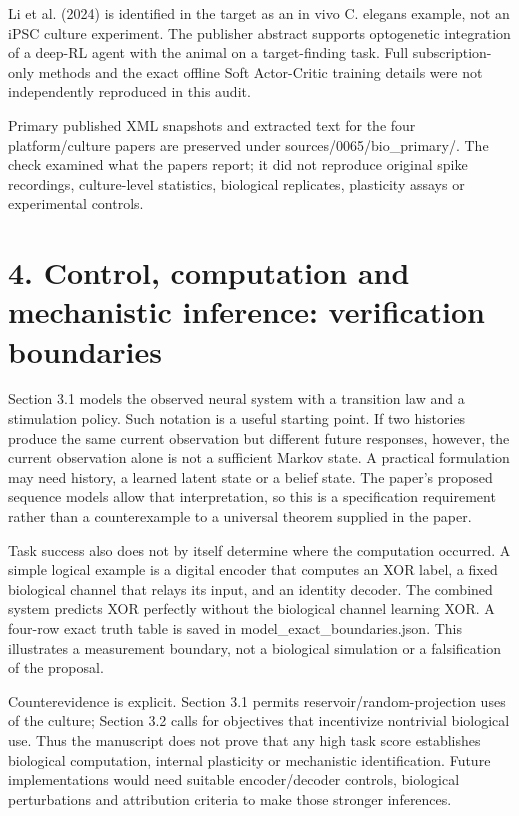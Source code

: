 \documentclass[10pt]{article}
\begin{document}
Li et al. (2024) is identified in the target as an in vivo C. elegans example, not an iPSC culture experiment. The publisher abstract supports optogenetic integration of a deep-RL agent with the animal on a target-finding task. Full subscription-only methods and the exact offline Soft Actor-Critic training details were not independently reproduced in this audit.\par
Primary published XML snapshots and extracted text for the four platform/culture papers are preserved under sources/0065/bio\_primary/. The check examined what the papers report; it did not reproduce original spike recordings, culture-level statistics, biological replicates, plasticity assays or experimental controls.\par
\section*{4. Control, computation and mechanistic inference: verification boundaries}
Section 3.1 models the observed neural system with a transition law and a stimulation policy. Such notation is a useful starting point. If two histories produce the same current observation but different future responses, however, the current observation alone is not a sufficient Markov state. A practical formulation may need history, a learned latent state or a belief state. The paper’s proposed sequence models allow that interpretation, so this is a specification requirement rather than a counterexample to a universal theorem supplied in the paper.\par
Task success also does not by itself determine where the computation occurred. A simple logical example is a digital encoder that computes an XOR label, a fixed biological channel that relays its input, and an identity decoder. The combined system predicts XOR perfectly without the biological channel learning XOR. A four-row exact truth table is saved in model\_exact\_boundaries.json. This illustrates a measurement boundary, not a biological simulation or a falsification of the proposal.\par
Counterevidence is explicit. Section 3.1 permits reservoir/random-projection uses of the culture; Section 3.2 calls for objectives that incentivize nontrivial biological use. Thus the manuscript does not prove that any high task score establishes biological computation, internal plasticity or mechanistic identification. Future implementations would need suitable encoder/decoder controls, biological perturbations and attribution criteria to make those stronger inferences.\par
\end{document}
